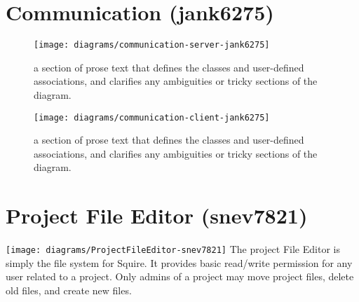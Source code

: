 \documentclass[11pt]{report}
\begin{document}
\section{Communication (jank6275)}
    \begin{wrapfigure}{r}{0.9\textwidth}
        \begin{center}
            \texttt{[image: diagrams/communication-server-jank6275]}
        \end{center}
        \caption{a section of prose text that defines the classes and user-defined associations, and clarifies any ambiguities or tricky sections of the diagram.}
    \end{wrapfigure}
    
    \begin{wrapfigure}{r}{0.9\textwidth}
        \begin{center}
            \texttt{[image: diagrams/communication-client-jank6275]}
        \end{center}
        \caption{ a section of prose text that defines the classes and user-defined associations, and clarifies any ambiguities or tricky sections of the diagram.}
    \end{wrapfigure}


\section{Project File Editor (snev7821)}
    \texttt{[image: diagrams/ProjectFileEditor-snev7821]}
    The project File Editor is simply the file system for Squire. It provides basic read/write permission for any user related to a project. Only admins of a project may move project files, delete old files, and create new files.


    
\end{document}
